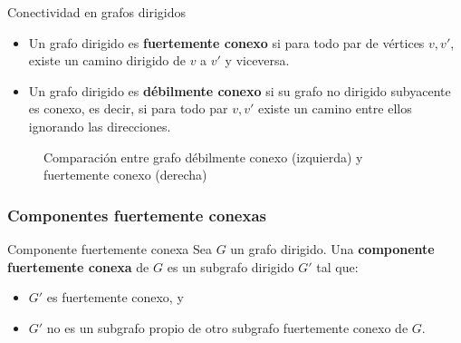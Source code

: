 \begin{definitionblock}{Conectividad en grafos dirigidos}
\begin{itemize}
  \item Un grafo dirigido es \textbf{fuertemente conexo} si para todo par de vértices $v, v'$, existe un camino dirigido de $v$ a $v'$ y viceversa.
  \item Un grafo dirigido es \textbf{débilmente conexo} si su grafo no dirigido subyacente es conexo, es decir, si para todo par $v, v'$ existe un camino entre ellos ignorando las direcciones.
\end{itemize}
\end{definitionblock}

\begin{figure}[h]
  \centering
  \vspace{-4em}
  \caption{Comparación entre grafo débilmente conexo (izquierda) y fuertemente conexo (derecha)}
\end{figure}



\subsubsection{Componentes fuertemente conexas}

\begin{definitionblock}{Componente fuertemente conexa}
Sea $G$ un grafo dirigido. Una \textbf{componente fuertemente conexa} de $G$ es un subgrafo dirigido $G'$ tal que:
\begin{itemize}
  \item $G'$ es fuertemente conexo, y
  \item $G'$ no es un subgrafo propio de otro subgrafo fuertemente conexo de $G$.
\end{itemize}
\end{definitionblock}



